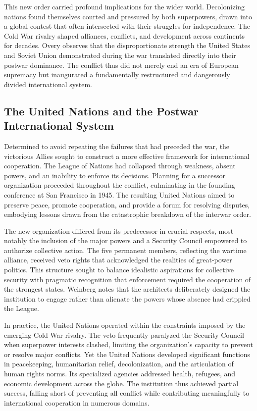 This new order carried profound implications for the wider world. Decolonizing nations found themselves courted and pressured by both superpowers, drawn into a global contest that often intersected with their struggles for independence. The Cold War rivalry shaped alliances, conflicts, and development across continents for decades. Overy observes that the disproportionate strength the United States and Soviet Union demonstrated during the war translated directly into their postwar dominance. The conflict thus did not merely end an era of European supremacy but inaugurated a fundamentally restructured and dangerously divided international system. \cite{weinberg1994} \cite{beevor2012} \cite{overy1995}

\subsection{The United Nations and the Postwar International System}
Determined to avoid repeating the failures that had preceded the war, the victorious Allies sought to construct a more effective framework for international cooperation. The League of Nations had collapsed through weakness, absent powers, and an inability to enforce its decisions. Planning for a successor organization proceeded throughout the conflict, culminating in the founding conference at San Francisco in 1945. The resulting United Nations aimed to preserve peace, promote cooperation, and provide a forum for resolving disputes, embodying lessons drawn from the catastrophic breakdown of the interwar order.

The new organization differed from its predecessor in crucial respects, most notably the inclusion of the major powers and a Security Council empowered to authorize collective action. The five permanent members, reflecting the wartime alliance, received veto rights that acknowledged the realities of great-power politics. This structure sought to balance idealistic aspirations for collective security with pragmatic recognition that enforcement required the cooperation of the strongest states. Weinberg notes that the architects deliberately designed the institution to engage rather than alienate the powers whose absence had crippled the League.

In practice, the United Nations operated within the constraints imposed by the emerging Cold War rivalry. The veto frequently paralyzed the Security Council when superpower interests clashed, limiting the organization's capacity to prevent or resolve major conflicts. Yet the United Nations developed significant functions in peacekeeping, humanitarian relief, decolonization, and the articulation of human rights norms. Its specialized agencies addressed health, refugees, and economic development across the globe. The institution thus achieved partial success, falling short of preventing all conflict while contributing meaningfully to international cooperation in numerous domains.


